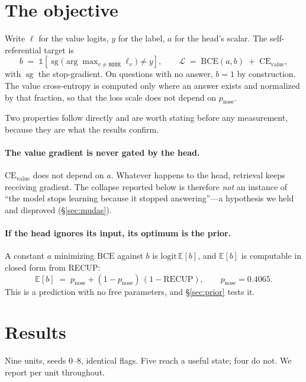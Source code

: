 \documentclass[11pt]{article}
\begin{document}
\section{The objective}
\label{sec:objetivo}

Write $\ell$ for the value logits, $y$ for the label, $a$ for the head's scalar. The self-referential
target is
\[
b \;=\; \mathbb{1}\!\left[\operatorname{sg}\!\big(\arg\max\nolimits_{v \neq \texttt{NOSE}} \ell_v\big) \neq y\right],
\qquad
\mathcal{L} \;=\; \mathrm{BCE}(a, b) \;+\; \mathrm{CE}_{\text{value}},
\]
with $\operatorname{sg}$ the stop-gradient. On questions with no answer, $b = 1$ by construction.
The value cross-entropy is computed only where an answer exists and normalized by that fraction, so
that the loss scale does not depend on $p_{\mathrm{nose}}$.

Two properties follow directly and are worth stating before any measurement, because they are what
the results confirm.

\paragraph{The value gradient is never gated by the head.} $\mathrm{CE}_{\text{value}}$ does not
depend on $a$. Whatever happens to the head, retrieval keeps receiving gradient. The collapse
reported below is therefore \emph{not} an instance of ``the model stops learning because it stopped
answering''---a hypothesis we held and disproved (\S\ref{sec:mudas}).

\paragraph{If the head ignores its input, its optimum is the prior.} A constant $a$ minimizing
$\mathrm{BCE}$ against $b$ is $\mathrm{logit}\,\mathbb{E}[b]$, and $\mathbb{E}[b]$ is computable in
closed form from RECUP:
\begin{equation}
\mathbb{E}[b] \;=\; p_{\mathrm{nose}} + (1 - p_{\mathrm{nose}})\,(1 - \mathrm{RECUP}),
\qquad p_{\mathrm{nose}} = 0.4065 .
\label{eq:prior}
\end{equation}
This is a prediction with no free parameters, and \S\ref{sec:prior} tests it.

\section{Results}

Nine units, seeds $0$--$8$, identical flags. Five reach a useful state; four do not. We report per
unit throughout.
\end{document}
